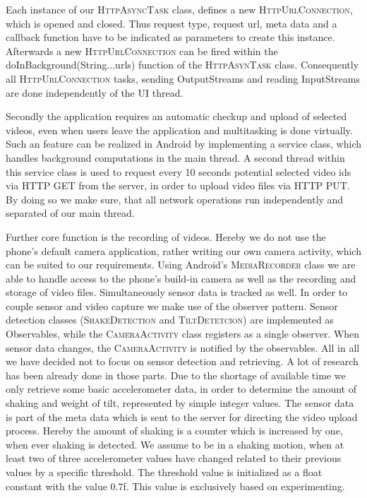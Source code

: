 \documentclass[conference]{IEEEtran}
\begin{document}
Each instance of our \textsc{HttpAsyncTask} class, defines a new \textsc{HttpUrlConnection}, which is opened and closed.
Thus request type, request url, meta data and a callback function have to be indicated as parameters to create this instance.
Afterwards a new \textsc{HttpUrlConnection} can be fired within the doInBackground(String...urls) function of the \textsc{HttpAsynTask} class. Consequently all \textsc{HttpUrlConnection} tasks,
sending OutputStreams and reading InputStreams are done independently of the UI thread.

Secondly the application requires an automatic checkup and upload of selected videos, even when users leave the application and multitasking 
is done virtually. Such an feature can be realized in Android by implementing a service class, which handles background computations in the main 
thread. A second thread within this service class is used to request  every 10 seconds potential selected video ids via HTTP GET from the server, in order to upload video files via HTTP PUT.
By doing so we make sure, that all network operations run independently and separated of our main thread.

Further core function is the recording of videos. Hereby we do not use the phone's default camera application,
rather writing our own camera activity, which can be suited to our requirements.
Using Android's \textsc{MediaRecorder} class we are able to handle access to the phone's build-in camera
as well as the recording and storage of video files.
Simultaneously sensor data is tracked as well.
In order to couple sensor and video capture we make use of the observer pattern.
Sensor detection classes (\textsc{ShakeDetection} and T\textsc{iltDetetcion}) are implemented as Observables,
while the \textsc{CameraActivity} class registers as a single observer. 
When sensor data changes, the \textsc{CameraActivity} is notified by the observables.
All in all we have decided not to focus on sensor detection and retrieving.
A lot of research has been already done in those parts. Due to the shortage of available time we only retrieve 
some basic accelerometer data, in order to determine the amount of shaking and weight of tilt, 
represented by simple integer values.
The sensor data is part of the meta data which is sent to the server for directing the video upload process.
Hereby the amount of shaking is a counter which is increased by one, when ever shaking is detected.
We assume to be in a shaking motion, when at least two of three accelerometer values have changed related
to their previous values by a specific threshold.
The threshold value is initialized as a float constant with the value 0.7f. This value is exclusively based on experimenting.
\end{document}
